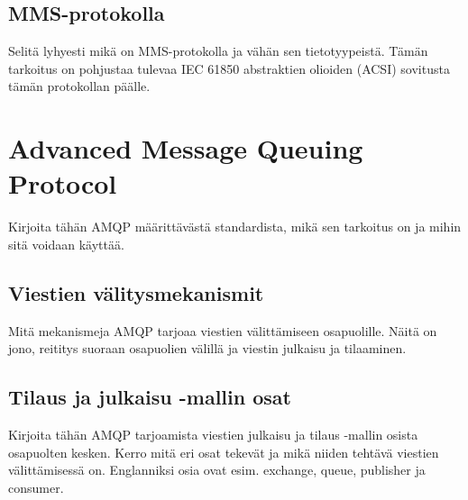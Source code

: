 \subsection{MMS-protokolla}
\begin{it}
	Selitä lyhyesti mikä on MMS-protokolla ja vähän sen tietotyypeistä. Tämän tarkoitus on pohjustaa tulevaa IEC 61850 abstraktien olioiden (ACSI) sovitusta tämän protokollan päälle.
\end{it}

\section{Advanced Message Queuing Protocol}
\begin{it}
	Kirjoita tähän AMQP määrittävästä standardista, mikä sen tarkoitus on ja mihin sitä voidaan käyttää.
\end{it}

\subsection{Viestien välitysmekanismit}
\begin{it}
	Mitä mekanismeja AMQP tarjoaa viestien välittämiseen osapuolille. Näitä on jono, reititys suoraan osapuolien välillä ja viestin julkaisu ja tilaaminen.
\end{it}

\subsection{Tilaus ja julkaisu -mallin osat}
\begin{it}
	Kirjoita tähän AMQP tarjoamista viestien julkaisu ja tilaus -mallin osista osapuolten kesken. Kerro mitä eri osat tekevät ja mikä niiden tehtävä viestien välittämisessä on. Englanniksi osia ovat esim. exchange, queue, publisher ja consumer.
\end{it}